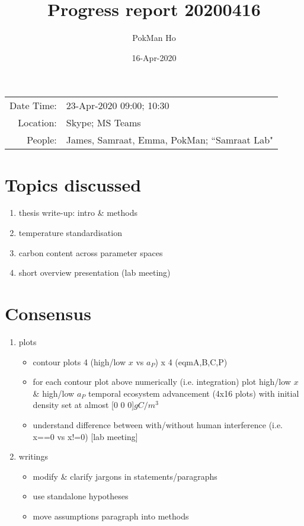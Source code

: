 \documentclass[a4paper,11pt]{article}
\title{Progress report 20200416}
\author{PokMan Ho}
\date{16-Apr-2020}
\begin{document}
    \maketitle
    
    \begin{tabular}{rl}
        Date Time: & 23-Apr-2020 09:00; 10:30 \\
        Location: & Skype; MS Teams \\
        People: & James, Samraat, Emma, PokMan; ``Samraat Lab" \\
    \end{tabular}
    
    \section{Topics discussed}
    \begin{enumerate}
        \item thesis write-up: intro \& methods
        \item temperature standardisation
        \item carbon content across parameter spaces
        \item short overview presentation (lab meeting)
    \end{enumerate}
    
    \section{Consensus}
    \begin{enumerate}
        \item plots
        \begin{itemize}
            \item contour plots 4 (high/low $x$ vs $a_P$) x 4 (eqmA,B,C,P)
            \item for each contour plot above numerically (i.e. integration) plot high/low $x$ \& high/low $a_P$ temporal ecosystem advancement (4x16 plots) with initial density set at almost [0 0 0]$gC/m^3$
            \item understand difference between with/without human interference (i.e. x==0 vs x!=0) [lab meeting]
        \end{itemize}
        \item writings
        \begin{itemize}
            \item modify \& clarify jargons in statements/paragraphs
            \item use standalone hypotheses
            \item move assumptions paragraph into methods
        \end{itemize}
    \end{enumerate}
\end{document}

